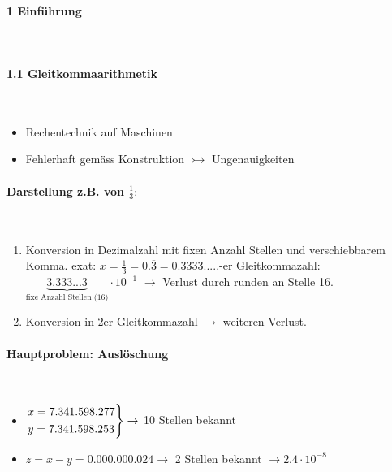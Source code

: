\noindent
\paragraph{1 Einführung}\mbox{}\\
\paragraph{1.1 Gleitkommaarithmetik}\mbox{}\\
\begin{itemize}
	\item Rechentechnik auf Maschinen
	\item Fehlerhaft gemäss Konstruktion $\rightarrowtail$ Ungenauigkeiten
\end{itemize}
\paragraph{Darstellung z.B. von $\frac{1}{3}:$}\mbox{}\\
\begin{enumerate}
	\item Konversion in Dezimalzahl mit fixen Anzahl Stellen und verschiebbarem Komma.\linebreak
          exat: $x = \frac{1}{3} = 0.\overline{3} = 0.3333.....$-er Gleitkommazahl: $\underbrace{3.333...3}_\text{fixe Anzahl Stellen (16)}\cdot 10^{-1}$\linebreak
          $\rightarrow$ Verlust durch runden an Stelle 16.
    \item Konversion in 2er-Gleitkommazahl \linebreak
          $\rightarrow$ weiteren Verlust.
\end{enumerate}
\paragraph{Hauptproblem: Auslöschung}\mbox{}\\
\begin{itemize}
	\item $
        \begin{rcases}
            \text{$x = 7.341.598.277$} \\
            \text{$y = 7.341.598.253$}
        \end{rcases}
        \rightarrow$ 10 Stellen bekannt
    \item $z = x-y = 0.000.000.024 \rightarrow$ 2 Stellen bekannt \linebreak
                   $\rightarrow 2.4\cdot 10^{-8}$
\end{itemize}
\vspace{1mm}

